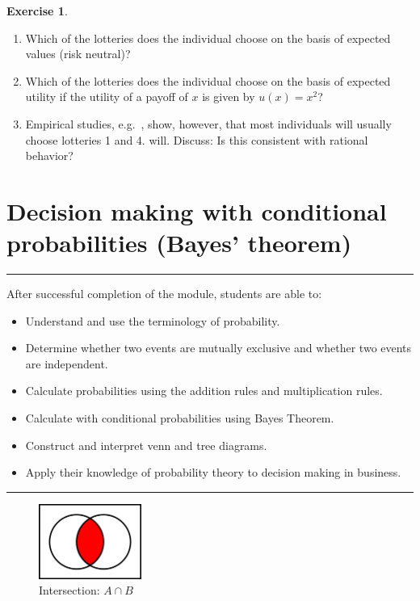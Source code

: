 \documentclass[
  12pt,
  oneside]{book}
\providecommand{\tightlist}{%
  \setlength{\itemsep}{0pt}\setlength{\parskip}{0pt}}
\theoremstyle{definition}
\theoremstyle{definition}
\theoremstyle{definition}
\newtheorem{exercise}{Exercise}[chapter]
\theoremstyle{definition}
\theoremstyle{remark}
\begin{document}
\begin{exercise}
\begin{enumerate}
\def\labelenumi{\alph{enumi})}
\tightlist
\item
  Which of the lotteries does the individual choose on the basis of expected values (risk neutral)?
\item
  Which of the lotteries does the individual choose on the basis of expected utility if the utility of a payoff of \(x\) is given by \(u(x) = x^2\)?
\item
  Empirical studies, e.g.~\cite{Camerer1992Recent}, show, however, that most individuals will usually choose lotteries 1 and 4. will. Discuss: Is this consistent with rational behavior?
\end{enumerate}

\end{exercise}

\hypertarget{decision-making-with-conditional-probabilities-bayes-theorem}{%
\section{Decision making with conditional probabilities (Bayes' theorem)}\label{decision-making-with-conditional-probabilities-bayes-theorem}}

\begin{center}\rule{0.5\linewidth}{0.5pt}\end{center}

After successful completion of the module, students are able to:

\begin{itemize}
\tightlist
\item
  Understand and use the terminology of probability.
\item
  Determine whether two events are mutually exclusive and whether two events are independent.
\item
  Calculate probabilities using the addition rules and multiplication rules.
\item
  Calculate with conditional probabilities using Bayes Theorem.
\item
  Construct and interpret venn and tree diagrams.
\item
  Apply their knowledge of probability theory to decision making in business.
\end{itemize}

\begin{center}\rule{0.5\linewidth}{0.5pt}\end{center}

\begin{figure}
\centering
\includegraphics[width=0.3\textwidth,height=\textheight]{fig/intersection.png}
\caption{\label{fig:afig} Intersection: \(A \cap B\)}
\end{figure}
\end{document}
